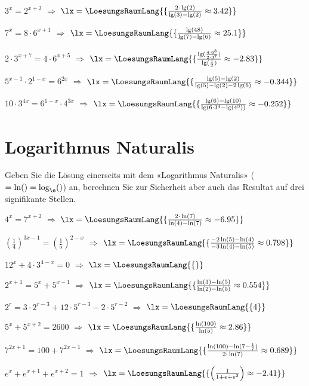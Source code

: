 \begin{bbwAufgabenBlock}
\item $3^x=2^{x+2}$ $\Longrightarrow$ $\lx=\LoesungsRaumLang{\{\frac{2\cdot{}\lg(2)}{\lg(3)-\lg(2)} \approx  3.42  \}}$ \plz{}
\item $7^x=8\cdot{}6^{x+1}$ $\Longrightarrow$ $\lx=\LoesungsRaumLang{\{\frac{\lg(48)}{\lg(7)-\lg(6)} \approx 25.1   \}}$ \plz{}
\item $2\cdot{}3^{x+7}=4\cdot{}6^{x+5}$ $\Longrightarrow$ $\lx=\LoesungsRaumLang{\{\frac{\lg(\frac{4\cdot{}6^5}{2\cdot{}3^7})}{\lg(\frac12)} \approx  -2.83  \}}$ \plz{}
\item $5^{x-1}\cdot{}2^{1-x}=6^{2x}$ $\Longrightarrow$ $\lx=\LoesungsRaumLang{\{\frac{\lg(5)-\lg(2)}{\lg(5)-\lg(2)-2\lg(6)} \approx -0.344   \}}$ \plz{}
\item $10\cdot{}3^{4x} = 6^{1-x}\cdot{}4^{3x}$ $\Longrightarrow$ $\lx=\LoesungsRaumLang{\{\frac{\lg(6)-\lg(10)}{\lg(6\cdot{}3^4 - \lg(4^3))} \approx -0.252   \}}$ \plz{}

\end{bbwAufgabenBlock}

\platzFuerBerechnungenBisEndeSeite{}

\section{Logarithmus Naturalis}
Geben Sie die Lösung einerseits mit dem «Logarithmus Naturalis»
($=\ln() = \log_{\e}()$) an, berechnen Sie zur Sicherheit aber auch das
Resultat auf drei signifikante Stellen.

\begin{bbwAufgabenBlock}
\item $4^x=7^{x+2}$ $\Longrightarrow$ $\lx=\LoesungsRaumLang{\{\frac{2\cdot{}\ln(7)}{\ln(4)-\ln(7)} \approx -6.95   \}}$ \plz{}
\item $\left(\frac14\right)^{3x-1} = \left(\frac15\right)^{2-x}$ $\Longrightarrow$ $\lx=\LoesungsRaumLang{\{\frac{-2\ln(5)-\ln(4)}{-3\ln(4)-\ln(5)} \approx 0.798   \}}$ \plz{}
\item $12^x+4\cdot{}3^{4-x}=0$ $\Longrightarrow$
$\lx=\LoesungsRaumLang{\{   \}}$  \plz{} \noTRAINER{\newpage}
\item $2^{x+1}=5^x + 5^{x-1}$ $\Longrightarrow$ $\lx=\LoesungsRaumLang{\{\frac{\ln(3)-\ln(5)}{\ln(2)-\ln(5)} \approx 0.554   \}}$ \plz{}
\item $2^r=3\cdot{}2^{r-3} + 12\cdot{}5^{r-3} - 2\cdot{}5^{r-2}$ $\Longrightarrow$ $\lx=\LoesungsRaumLang{\{ 4 \}}$ \plz{}
\item $5^x + 5^{x+2} = 2600$ $\Longrightarrow$ $\lx=\LoesungsRaumLang{\{\frac{\ln(100)}{\ln(5)} \approx 2.86   \}}$ \plz{}
\item $7^{2x+1} = 100 + 7^{2x-1}$ $\Longrightarrow$ $\lx=\LoesungsRaumLang{\{\frac{\ln(100) - \ln(7-\frac17)}{2\cdot{}\ln(7)} \approx  0.689  \}}$ \plz{}\noTRAINER{\newpage}
\item $e^x + e^{x+1} + e^{x+2} = 1$ $\Longrightarrow$ $\lx=\LoesungsRaumLang{\{\left(\frac{1}{1+e+e^2}\right) \approx -2.41  \}}$ \plz{}

\end{bbwAufgabenBlock}

